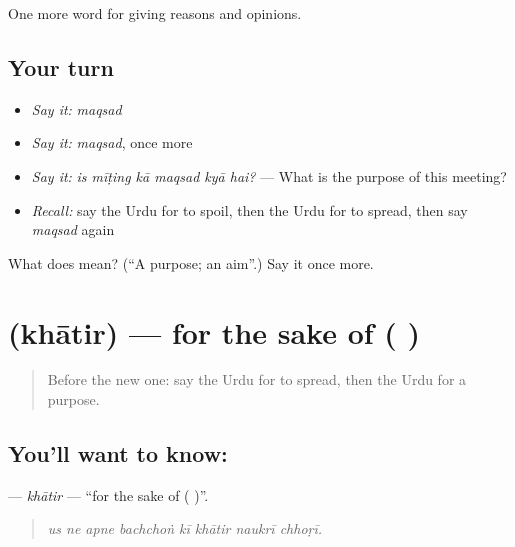 \begin{grammarlens}[title={What you've built}]
One more word for giving reasons and opinions.
\end{grammarlens}

\subsection*{Your turn}
\begin{itemize}
\raggedright
  \item \emph{Say it:} \emph{maqsad}
  \item \emph{Say it:} \emph{maqsad}, once more
  \item \emph{Say it:} \emph{is mīṭing kā maqsad kyā hai?} — What is the purpose of this meeting?
  \item \emph{Recall:} say the Urdu for to spoil, then the Urdu for to spread, then say \emph{maqsad} again
\end{itemize}

\begin{tcolorbox}[breakable,colback=teal!4,colframe=teal!35!black,title={Before you move on}]
What does  mean? (\textquotedblleft{}A purpose; an aim\textquotedblright{}.) Say it once more.
\end{tcolorbox}
\section[\texorpdfstring{\ur{خاطر} (khātir)}{خاطر (khātir)}]{ (khātir) — for the sake of ( )}

\label{lesson:UR-C333-khatir}



\begin{quote}
Before the new one: say the Urdu for to spread, then the Urdu for a purpose.
\end{quote}

\subsection*{You'll want to know: }
\textbf{} — \emph{khātir} — \textquotedblleft{}for the sake of ( )\textquotedblright{}.

\begin{quote}
       
\end{quote}

\begin{quote}
\emph{us ne apne bachchoṅ kī khātir naukrī chhoṛī.}
\end{quote}

